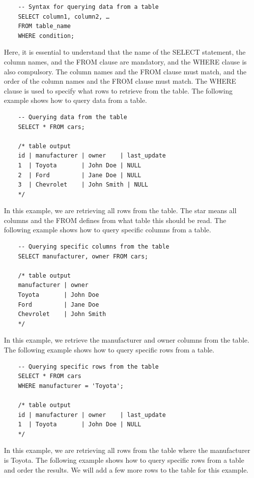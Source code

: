 \begin{verbatim}
    -- Syntax for querying data from a table
    SELECT column1, column2, …
    FROM table_name
    WHERE condition;
\end{verbatim}

Here, it is essential to understand that the name of the SELECT statement, the column names, and the FROM clause are mandatory, and the WHERE clause is also compulsory. The column names and the FROM clause must match, and the order of the column names and the FROM clause must match. The WHERE clause is used to specify what rows to retrieve from the table. The following example shows how to query data from a table.

\begin{verbatim}
    -- Querying data from the table
    SELECT * FROM cars;

    /* table output
    id | manufacturer | owner    | last_update
    1  | Toyota       | John Doe | NULL
    2  | Ford         | Jane Doe | NULL
    3  | Chevrolet    | John Smith | NULL
    */
\end{verbatim}

In this example, we are retrieving all rows from the table. The star means all columns and the FROM defines from what table this should be read. The following example shows how to query specific columns from a table.

\begin{verbatim}
    -- Querying specific columns from the table
    SELECT manufacturer, owner FROM cars;

    /* table output
    manufacturer | owner
    Toyota       | John Doe
    Ford         | Jane Doe
    Chevrolet    | John Smith
    */
\end{verbatim}

In this example, we retrieve the manufacturer and owner columns from the table. The following example shows how to query specific rows from a table.

\begin{verbatim}
    -- Querying specific rows from the table
    SELECT * FROM cars
    WHERE manufacturer = 'Toyota';

    /* table output
    id | manufacturer | owner    | last_update
    1  | Toyota       | John Doe | NULL
    */
\end{verbatim}

In this example, we are retrieving all rows from the table where the manufacturer is Toyota. The following example shows how to query specific rows from a table and order the results. We will add a few more rows to the table for this example.

